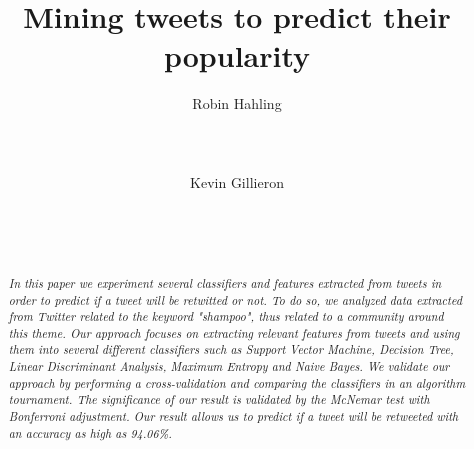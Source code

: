 \documentclass{sigchi}
\newcommand\tabhead[1]{\small\textbf{#1}}
\begin{document}
\title{Mining tweets to predict their popularity}

\author{
  \alignauthor Robin Hahling\\
    \\
    \\
    \\
  \alignauthor Kevin Gillieron\\
    \\
    \\
    \\
}

\maketitle

\begin{abstract}
\textit{
In this paper we experiment several classifiers and features extracted from
tweets in order to predict if a tweet will be retwitted or not.
To do so, we analyzed data extracted from Twitter related to the keyword
"shampoo", thus related to a community around this theme.
Our approach focuses on extracting relevant features from tweets and using them
into several different classifiers such as Support Vector Machine, Decision
Tree, Linear Discriminant Analysis, Maximum Entropy and Naive Bayes.
We validate our approach by performing a cross-validation and comparing the
classifiers in an algorithm tournament. The significance of our result is
validated by the McNemar test with Bonferroni adjustment.
Our result allows us to predict if a tweet will be retweeted with an accuracy as
high as 94.06\%.
}
\end{abstract}





% 
\end{document}
